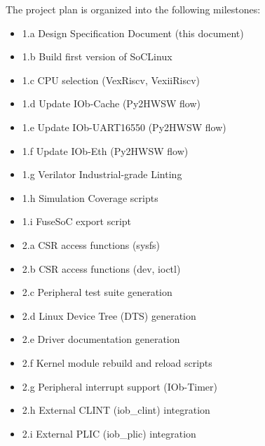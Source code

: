 %

The project plan is organized into the following milestones:

\begin{description}[itemsep=3ex]
    \item[Milestone 1 - Specification and Integration] \leavevmode
    \begin{itemize}[topsep=0pt, partopsep=0pt, itemsep=0.5ex, parsep=0pt]
        \item [$\checkmark$] 1.a Design Specification Document (this document)
        \item [$\checkmark$] 1.b Build first version of SoCLinux
        \item [$\checkmark$] 1.c CPU selection (VexRiscv, VexiiRiscv)
        \item [$\checkmark$] 1.d Update IOb-Cache (Py2HWSW flow)
        \item [$\checkmark$] 1.e Update IOb-UART16550 (Py2HWSW flow)
        \item [$\checkmark$] 1.f Update IOb-Eth (Py2HWSW flow)
        \item [$\checkmark$] 1.g Verilator Industrial-grade Linting
        \item [$\checkmark$] 1.h Simulation Coverage scripts
        \item [$\checkmark$] 1.i FuseSoC export script
    \end{itemize}

    \item[Milestone 2 - Linux Driver Creation] \leavevmode
    \begin{itemize}[topsep=0pt, partopsep=0pt, itemsep=0.5ex, parsep=0pt]
        \item [$\checkmark$] 2.a CSR access functions (sysfs)
        \item [$\checkmark$] 2.b CSR access functions (dev, ioctl)
        \item [$\checkmark$] 2.c Peripheral test suite generation
        \item [$\checkmark$] 2.d Linux Device Tree (DTS) generation
        \item [$\checkmark$] 2.e Driver documentation generation
        \item [$\checkmark$] 2.f Kernel module rebuild and reload scripts
        \item [$\checkmark$] 2.g Peripheral interrupt support (IOb-Timer)
        \item [$\checkmark$] 2.h External CLINT (iob\_clint) integration
        \item [$\checkmark$] 2.i External PLIC (iob\_plic) integration
    \end{itemize}


\end{description}
